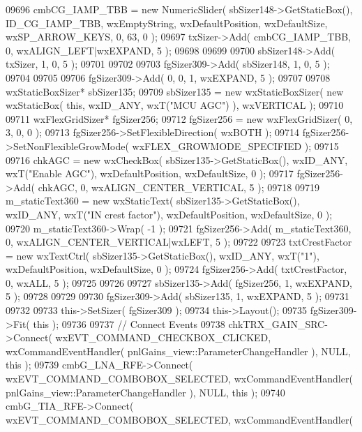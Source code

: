 \begin{DoxyCode}
09696     cmbCG_IAMP_TBB = \textcolor{keyword}{new} NumericSlider( sbSizer148->GetStaticBox(), 
      ID_CG_IAMP_TBB, wxEmptyString, wxDefaultPosition, wxDefaultSize, wxSP\_ARROW\_KEYS, 0, 63, 0 );
09697     txSizer->Add( cmbCG_IAMP_TBB, 0, wxALIGN\_LEFT|wxEXPAND, 5 );
09698     
09699     
09700     sbSizer148->Add( txSizer, 1, 0, 5 );
09701     
09702     
09703     fgSizer309->Add( sbSizer148, 1, 0, 5 );
09704     
09705     
09706     fgSizer309->Add( 0, 0, 1, wxEXPAND, 5 );
09707     
09708     wxStaticBoxSizer* sbSizer135;
09709     sbSizer135 = \textcolor{keyword}{new} wxStaticBoxSizer( \textcolor{keyword}{new} wxStaticBox( \textcolor{keyword}{this}, wxID\_ANY, wxT(\textcolor{stringliteral}{"MCU AGC"}) ), wxVERTICAL );
09710     
09711     wxFlexGridSizer* fgSizer256;
09712     fgSizer256 = \textcolor{keyword}{new} wxFlexGridSizer( 0, 3, 0, 0 );
09713     fgSizer256->SetFlexibleDirection( wxBOTH );
09714     fgSizer256->SetNonFlexibleGrowMode( wxFLEX\_GROWMODE\_SPECIFIED );
09715     
09716     chkAGC = \textcolor{keyword}{new} wxCheckBox( sbSizer135->GetStaticBox(), wxID\_ANY, wxT(\textcolor{stringliteral}{"Enable AGC"}), wxDefaultPosition, 
      wxDefaultSize, 0 );
09717     fgSizer256->Add( chkAGC, 0, wxALIGN\_CENTER\_VERTICAL, 5 );
09718     
09719     m_staticText360 = \textcolor{keyword}{new} wxStaticText( sbSizer135->GetStaticBox(), wxID\_ANY, wxT(\textcolor{stringliteral}{"IN crest factor"}), 
      wxDefaultPosition, wxDefaultSize, 0 );
09720     m_staticText360->Wrap( -1 );
09721     fgSizer256->Add( m_staticText360, 0, wxALIGN\_CENTER\_VERTICAL|wxLEFT, 5 );
09722     
09723     txtCrestFactor = \textcolor{keyword}{new} wxTextCtrl( sbSizer135->GetStaticBox(), wxID\_ANY, wxT(\textcolor{stringliteral}{"1"}), wxDefaultPosition, 
      wxDefaultSize, 0 );
09724     fgSizer256->Add( txtCrestFactor, 0, wxALL, 5 );
09725     
09726     
09727     sbSizer135->Add( fgSizer256, 1, wxEXPAND, 5 );
09728     
09729     
09730     fgSizer309->Add( sbSizer135, 1, wxEXPAND, 5 );
09731     
09732     
09733     this->SetSizer( fgSizer309 );
09734     this->Layout();
09735     fgSizer309->Fit( \textcolor{keyword}{this} );
09736     
09737     \textcolor{comment}{// Connect Events}
09738     chkTRX_GAIN_SRC->Connect( wxEVT\_COMMAND\_CHECKBOX\_CLICKED, wxCommandEventHandler( 
      pnlGains_view::ParameterChangeHandler ), NULL, \textcolor{keyword}{this} );
09739     cmbG_LNA_RFE->Connect( wxEVT\_COMMAND\_COMBOBOX\_SELECTED, wxCommandEventHandler( 
      pnlGains_view::ParameterChangeHandler ), NULL, \textcolor{keyword}{this} );
09740     cmbG_TIA_RFE->Connect( wxEVT\_COMMAND\_COMBOBOX\_SELECTED, wxCommandEventHandler( 

\end{DoxyCode}
